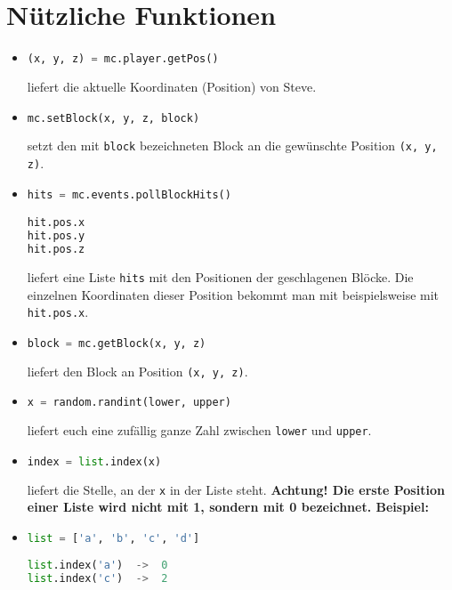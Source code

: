 \documentclass{article}
\begin{document}
	\section{Nützliche Funktionen}
	\begin{itemize}
		\item[] \begin{lstlisting}[language=Python]
(x, y, z) = mc.player.getPos()
		\end{lstlisting}
		liefert die aktuelle Koordinaten (Position) von Steve.
		
		\item[] \begin{lstlisting}[language=Python]
mc.setBlock(x, y, z, block)
		\end{lstlisting}
		setzt den mit \texttt{block} bezeichneten Block an die gewünschte Position \texttt{(x, y, z)}.
		
		\item[] \begin{lstlisting}[language=Python]
hits = mc.events.pollBlockHits()

hit.pos.x
hit.pos.y
hit.pos.z
		\end{lstlisting}
		liefert eine Liste \texttt{hits} mit den Positionen der geschlagenen Blöcke. Die einzelnen Koordinaten dieser Position bekommt man mit beispielsweise mit \texttt{hit.pos.x}.
		
		\item[] \begin{lstlisting}[language=Python]
block = mc.getBlock(x, y, z)
		\end{lstlisting}
		liefert den Block an Position \texttt{(x, y, z)}.
		
		\item[] \begin{lstlisting}[language=Python]
x = random.randint(lower, upper)
		\end{lstlisting}
		liefert euch eine zufällig ganze Zahl zwischen \texttt{lower} und \texttt{upper}.
		
		\item[] \begin{lstlisting}[language=Python]
index = list.index(x)
		\end{lstlisting}
		liefert die Stelle, an der \texttt{x} in der Liste steht. \textbf{Achtung! Die erste Position einer Liste wird nicht mit 1, sondern mit 0 bezeichnet. Beispiel:}
		\item[] \begin{lstlisting}[language=Python]
list = ['a', 'b', 'c', 'd']
		
list.index('a')  ->  0
list.index('c')  ->  2
		\end{lstlisting}
	\end{itemize}
\end{document}
